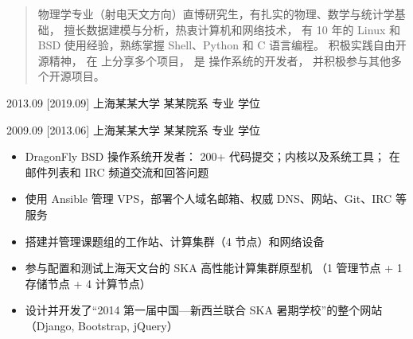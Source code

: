 \documentclass[zh]{resume}
\begin{document}
\makeheader

\begin{abstract}
物理学专业（射电天文方向）直博研究生，有扎实的物理、数学与统计学基础，
擅长数据建模与分析，热衷计算机和网络技术，
有 10 年的 Linux 和 BSD 使用经验，熟练掌握 Shell、Python 和 C 语言编程。
积极实践自由开源精神，
在  上分享多个项目，
是  操作系统的开发者，
并积极参与其他多个开源项目。
\end{abstract}

\begin{competences}
\end{competences}

\begin{educations}
  \education%
    {2013.09}%
    [2019.09]%
    {上海某某大学}%
    {某某院系}%
    {专业}%
    {学位}

  \separator{0.5ex}
  \education%
    {2009.09}%
    [2013.06]%
    {上海某某大学}%
    {某某院系}%
    {专业}%
    {学位}
\end{educations}

\begin{itemize}
  \item DragonFly BSD 操作系统开发者：
    200+ 代码提交；内核以及系统工具；
    在邮件列表和 IRC 频道交流和回答问题
  \item 使用 Ansible 管理 VPS，部署个人域名邮箱、权威 DNS、网站、Git、IRC 等服务
  \item 搭建并管理课题组的工作站、计算集群（4 节点）和网络设备
  \item 参与配置和测试上海天文台的 SKA 高性能计算集群原型机
    （1 管理节点 + 1 存储节点 + 4 计算节点）
  \item 设计并开发了\enquote{2014 第一届中国—新西兰联合 SKA 暑期学校}的整个网站
    （Django, Bootstrap, jQuery）
\end{itemize}
\end{document}
